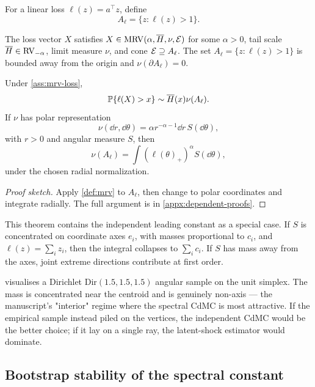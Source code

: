 For a linear loss \(\ell(z)=a^\top z\), define
\[
  A_\ell=\{z:\ell(z)>1\}.
\]

\begin{assumption}
\label{ass:mrv-loss}
The loss vector $X$ satisfies $X\in\mathrm{MRV}(\alpha,\overline{H},\nu,\mathcal{E})$ for some
$\alpha>0$, tail scale $\overline{H}\in\mathrm{RV}_{-\alpha}$, limit measure $\nu$, and cone
$\mathcal{E}\supseteq A_\ell$. The set $A_\ell=\{z:\ell(z)>1\}$ is bounded away from
the origin and $\nu(\partial A_\ell)=0$.
\end{assumption}

\begin{theorem}
\label{thm:mrv-linear-risk}
Under \cref{ass:mrv-loss},
\[
  \mathbb{P}\{\ell(X)>x\}
  \sim \overline{H}(x)\nu(A_\ell).
\]
If \(\nu\) has polar representation
\[
  \nu(\dd r,\dd\theta)=\alpha r^{-\alpha-1}\dd r\,S(\dd\theta),
\]
with \(r>0\) and angular measure \(S\), then
\[
  \nu(A_\ell)=\int (\ell(\theta)_+)^\alpha S(\dd\theta),
\]
under the chosen radial normalization.
\end{theorem}

\begin{proof}[Proof sketch]
Apply \cref{def:mrv} to $A_\ell$, then change to polar coordinates and
integrate radially. The full argument is in \cref{appx:dependent-proofs}.
\end{proof}

This theorem contains the independent leading constant as a special case. If
\(S\) is concentrated on coordinate axes \(e_i\), with masses proportional to
\(c_i\), and \(\ell(z)=\sum_i z_i\), then the integral collapses to
\(\sum_i c_i\). If \(S\) has mass away from the axes, joint extreme directions
contribute at first order.



 visualises a Dirichlet
$\mathrm{Dir}(1.5, 1.5, 1.5)$ angular sample on the unit simplex. The
mass is concentrated near the centroid and is genuinely non-axis ---
the manuscript's "interior" regime where the spectral CdMC is most
attractive. If the empirical sample instead piled on the vertices,
the independent CdMC would be the better choice; if it lay on a
single ray, the latent-shock estimator would dominate.

\subsection{Bootstrap stability of the spectral constant}
\label{sec:mrv-bootstrap}

